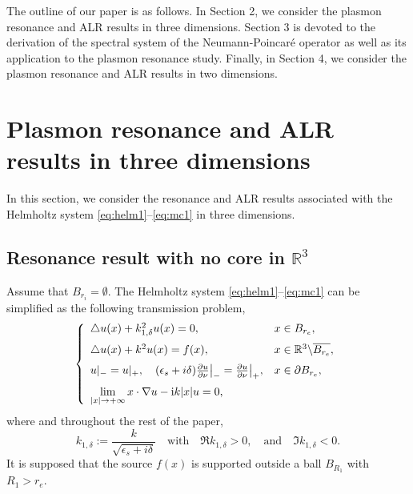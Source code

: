 \documentclass[11pt,reqno,twoside]{amsart}
\theoremstyle{definition}
\theoremstyle{remark}
\numberwithin{equation}{section}
\begin{document}
The outline of our paper is as follows. In Section 2, we consider the plasmon resonance and ALR results in three dimensions. Section 3 is devoted to the derivation of the spectral system of the Neumann-Poincar\'e operator as well as its application to the plasmon resonance study. Finally, in Section 4, we consider the plasmon resonance and ALR results in two dimensions.


\section{Plasmon resonance and ALR results in three dimensions}

In this section, we consider the resonance and ALR results associated with the Helmholtz system \eqref{eq:helm1}--\eqref{eq:mc1} in three dimensions. 

\subsection{Resonance result with no core in $\mathbb{R}^3$}

Assume that $B_{r_i}=\emptyset$. The Helmholtz system \eqref{eq:helm1}--\eqref{eq:mc1} can be simplified as the following transmission problem,
\begin{equation}\label{eq:general equation_without_core}
 \left\{
   \begin{array}{ll}
     \triangle u(x) + k_{1,\delta}^2 u(x) =0, & x\in B_{r_e},\medskip \\
     \triangle u(x) + k^2 u(x) =f(x), & x\in \mathbb{R}^3\backslash\overline{B_{r_e}}, \medskip\\
     {u|_-=u|_+, \quad (\epsilon_s+i\delta) \frac{\partial u}{\partial\nu}\big|_-= \frac{\partial u}{\partial\nu}\big|_+,} & x\in\partial B_{r_e},\medskip \\
   \displaystyle{\lim_{|x|\rightarrow+\infty} x\cdot\nabla u-\mathrm{i} k |x| u=0},
   \end{array}
 \right.
\end{equation}
where and throughout the rest of the paper,
\begin{equation}\label{eq:definition_k_1}
  k_{1,\delta}:=\frac{k}{\sqrt{\epsilon_s+i\delta}}\quad \mbox{with}\quad \Re{k_{1,\delta}}>0, \quad \mbox{and} \quad \Im{k_{1,\delta}}<0.
\end{equation}
It is supposed that the source $f(x)$ is supported outside a ball $B_{R_1}$ with $R_1>r_e$.
\end{document}
